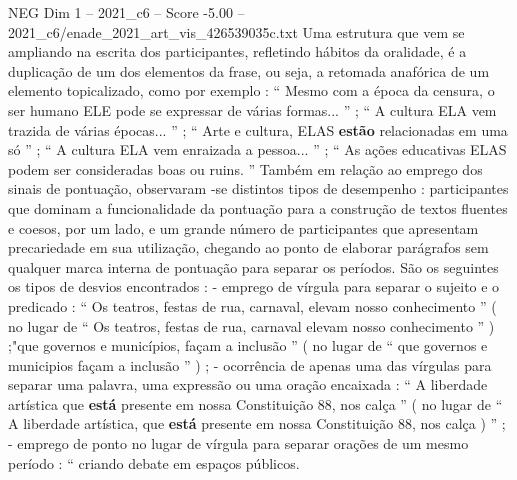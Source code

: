 \begin{textsample}{NEG Dim 1 – 2021\_c6 – Score -5.00 – 2021\_c6/enade\_2021\_art\_vis\_426539035c.txt}
Uma estrutura que vem se ampliando na escrita dos participantes, refletindo hábitos da oralidade, é a duplicação de um dos elementos da frase, ou seja, a retomada anafórica de um elemento topicalizado, como por exemplo : “ Mesmo com a época da censura, o ser humano ELE pode se expressar de várias formas... ” ; “ A cultura ELA vem trazida de várias épocas... ” ; “ Arte e cultura, ELAS \textbf{estão} relacionadas em uma só ” ; “ A cultura ELA vem enraizada a pessoa... ” ; “ As ações educativas ELAS podem ser consideradas boas ou ruins. ” Também em relação ao emprego dos sinais de pontuação, observaram -se distintos tipos de desempenho : participantes que dominam a funcionalidade da pontuação para a construção de textos fluentes e coesos, por um lado, e um grande número de participantes que apresentam precariedade em sua utilização, chegando ao ponto de elaborar parágrafos sem qualquer marca interna de pontuação para separar os períodos.
São os seguintes os tipos de desvios encontrados : - emprego de vírgula para separar o sujeito e o predicado : “ Os teatros, festas de rua, carnaval, elevam nosso conhecimento ” ( no lugar de “ Os teatros, festas de rua, carnaval elevam nosso conhecimento ” ) ;"que governos e municípios, façam a inclusão ” ( no lugar de “ que governos e municipios façam a inclusão ” ) ; - ocorrência de apenas uma das vírgulas para separar uma palavra, uma expressão ou uma oração encaixada : “ A liberdade artística que \textbf{está} presente em nossa Constituição 88, nos calça ” ( no lugar de “ A liberdade artística, que \textbf{está} presente em nossa Constituição 88, nos calça ) ” ; - emprego de ponto no lugar de vírgula para separar orações de um mesmo período : “ criando debate em espaços públicos.

\end{textsample}
